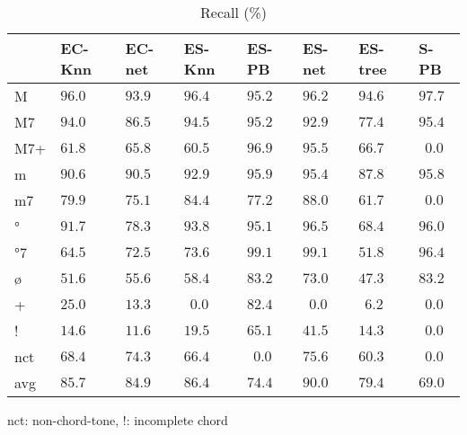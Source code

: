 \documentclass{article}
\begin{document}
\begin{table}
  \centering
  \begin{tabular}{l|p{.5cm}p{.5cm}p{.5cm}p{.5cm}p{.5cm}p{.5cm}p{.5cm}}

   &EC-Knn&EC-net &ES-Knn &ES-PB  &ES-net &ES-tree&S-PB   \\
\hline                                            
M  &$96.0$&$ 93.9$&$ 96.4$&$ 95.2$&$ 96.2$&$ 94.6$&$ 97.7$ \\
M7 &$94.0$&$ 86.5$&$ 94.5$&$ 95.2$&$ 92.9$&$ 77.4$&$ 95.4$ \\
M7+&$61.8$&$ 65.8$&$ 60.5$&$ 96.9$&$ 95.5$&$ 66.7$&$~~0.0$ \\
m  &$90.6$&$ 90.5$&$ 92.9$&$ 95.9$&$ 95.4$&$ 87.8$&$ 95.8$ \\
m7 &$79.9$&$ 75.1$&$ 84.4$&$ 77.2$&$ 88.0$&$ 61.7$&$~~0.0$ \\
°  &$91.7$&$ 78.3$&$ 93.8$&$ 95.1$&$ 96.5$&$ 68.4$&$ 96.0$ \\
°7 &$64.5$&$ 72.5$&$ 73.6$&$ 99.1$&$ 99.1$&$ 51.8$&$ 96.4$ \\
ø  &$51.6$&$ 55.6$&$ 58.4$&$ 83.2$&$ 73.0$&$ 47.3$&$ 83.2$ \\
+  &$25.0$&$ 13.3$&$~~0.0$&$ 82.4$&$~~0.0$&$~~6.2$&$~~0.0$ \\
!  &$14.6$&$ 11.6$&$ 19.5$&$ 65.1$&$ 41.5$&$ 14.3$&$~~0.0$ \\
nct&$68.4$&$ 74.3$&$ 66.4$&$~~0.0$&$ 75.6$&$ 60.3$&$~~0.0$ \\
avg&$85.7$&$ 84.9$&$ 86.4$&$ 74.4$&$ 90.0$&$ 79.4$&$ 69.0$ \\
  \end{tabular}                                                        

\medskip

nct: non-chord-tone, !: incomplete chord
  \caption{Recall (\%)}
  \label{tab:recall}
\end{table}
\end{document}

